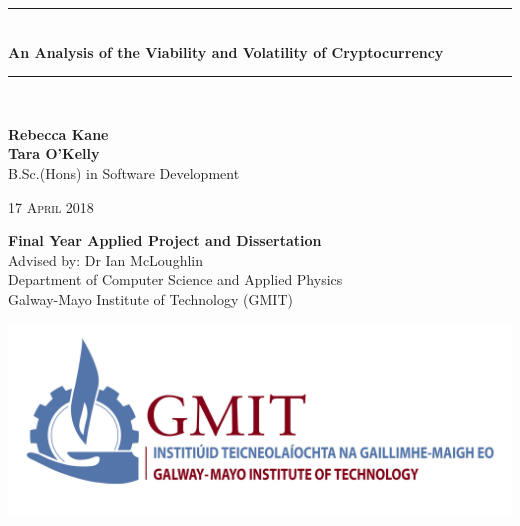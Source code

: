 \documentclass[12pt,a4paper]{report}
\newcommand{\projecttitle}{An Analysis of the Viability and Volatility of Cryptocurrency}
\newcommand{\projectauthor}{Rebecca Kane \\[0.2cm] Tara O'Kelly}
\newcommand{\projectadvisor}{Dr Ian McLoughlin}
\newcommand{\projectprogramme}{B.Sc.(Hons) in Software Development}
\newcommand{\projectdate}{17 April 2018}
\begin{document}
  \begin{titlepage}
  \centering
    \begin{minipage}[t][6cm]{\textwidth}
      \centering
      \rule{\linewidth}{0.5mm} \\[0.4cm]
      { \LARGE \bfseries \projecttitle \\[0.4cm] }
      \rule{\linewidth}{0.5mm} \\[0.8cm]
    \end{minipage}
    
    \begin{minipage}[t][6.5cm]{\textwidth}
      \centering
      \textbf{\projectauthor}\\[0.5cm]
      \projectprogramme
    \end{minipage}
  
    \begin{minipage}[t][1cm]{\textwidth}
      \centering
      \textsc{\projectdate}
    \end{minipage}
      
    \begin{minipage}[t][3cm]{\textwidth}
      \centering
      \textbf{Final Year Applied Project and Dissertation}\\[0.3cm]
      Advised by: \projectadvisor \\[0.1cm]
      Department of Computer Science and Applied Physics\\
      Galway-Mayo Institute of Technology (GMIT)
    \end{minipage}
  
    \begin{center}    
      \includegraphics[scale=0.5]{img/gmit.jpeg}
    \end{center}
  \end{titlepage}
  \setcounter{page}{2}
  \tableofcontents
  
  
  
\end{document}
